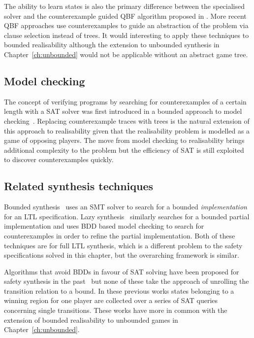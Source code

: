 The ability to learn states is also the primary difference between the specialised solver and the counterexample guided QBF algorithm proposed in \cite{Janota12}. More recent QBF approaches use counterexamples to guide an abstraction of the problem via clause selection instead of trees. It would interesting to apply these techniques to bounded realisability although the extension to unbounded synthesis in Chapter~\ref{ch:unbounded} would not be applicable without an abstract game tree.

\subsection{Model checking}

The concept of verifying programs by searching for counterexamples of a certain length with a SAT solver was first introduced in a bounded approach to model checking~\cite{Biere99}. Replacing counterexample traces with trees is the natural extension of this approach to realisability given that the realisability problem is modelled as a game of opposing players.  The move from model checking to realisability brings additional complexity to the problem but the efficiency of SAT is still exploited to discover counterexamples quickly.

\subsection{Related synthesis techniques}

Bounded synthesis~\cite{Finkbeiner13} uses an SMT solver to search for a bounded \emph{implementation} for an LTL specification. Lazy synthesis~\cite{Finkbeiner12} similarly searches for a bounded partial implementation and uses BDD based model checking to search for counterexamples in order to refine the partial implementation. Both of these techniques are for full LTL synthesis, which is a different problem to the safety specifications solved in this chapter, but the overarching framework is similar. 

Algorithms that avoid BDDs in favour of SAT solving have been proposed for safety synthesis in the past~\cite{Morgenstern13,Chiang15,Bloem14} but none of these take the approach of unrolling the transition relation to a bound. In these previous works states belonging to a winning region for one player are collected over a series of SAT queries concerning single transitions. These works have more in common with the extension of bounded realisability to unbounded games in Chapter~\ref{ch:unbounded}.

